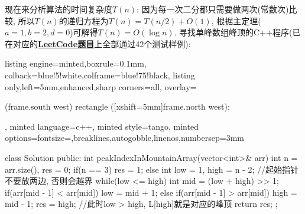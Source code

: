 \documentclass{article}
\begin{document}
\begin{homeworkProblem}
\begin{algorithm}[H]
	\end{algorithm}
	现在来分析算法的时间复杂度$T(n)$: 因为每一次二分都只需要做两次(常数次)比较, 所以$T(n)$的递归方程为$T\left( n \right) =T\left( n/2 \right) +O\left( 1 \right) $, 根据主定理($a=1,b=2,d=0$)可解得$T\left( n \right) =O\left( \log n \right) $.
	\newpage
	寻找单峰数组峰顶的C++程序(已在对应的\href{https://leetcode.cn/problems/B1IidL/}{\textbf{LeetCode题目}}上全部通过42个测试样例):
\begin{tcblisting}{listing engine=minted,boxrule=0.1mm,
colback=blue!5!white,colframe=blue!75!black,
listing only,left=5mm,enhanced,sharp corners=all,
overlay={\begin{tcbclipinterior} (frame.south west)
rectangle ([xshift=5mm]frame.north west);\end{tcbclipinterior}},
minted language=c++,
minted style=tango,
minted options={fontsize=\small,breaklines,autogobble,linenos,numbersep=3mm}}
class Solution {
public:
    int peakIndexInMountainArray(vector<int>& arr) {
        int n = arr.size(), res = 0;
        if(n == 3) {
            res = 1;
        }
        else {
            int low = 1, high = n - 2;  //起始指针不要放两边, 否则会越界
            while(low <= high) {
                int mid = (low + high) >> 1;
                if(arr[mid - 1] < arr[mid]) {
                    low = mid + 1;
                }
                else if(arr[mid - 1] > arr[mid]) {
                    high = mid - 1;
                }
            }
            res = high;  //此时low > high, L[high]就是对应的峰顶
        }
        return res;
    }
};
\end{tcblisting}
\end{homeworkProblem}

\pagebreak
\end{document}
